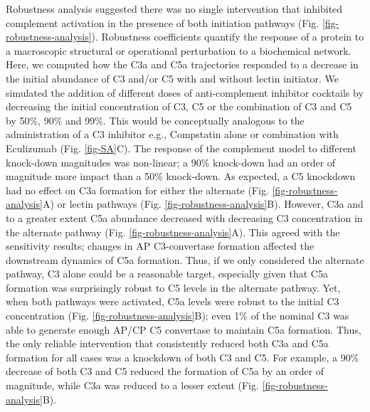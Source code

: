 \documentclass[12pt]{article}
\begin{document}
Robustness analysis suggested there was no single intervention that inhibited complement activation in the presence of both initiation pathways (Fig. \ref{fig-robustness-analysis}).
Robustness coefficients quantify the response of a protein to a macroscopic structural or operational perturbation to a biochemical network.
Here, we computed how the C3a and C5a trajectories responded to a decrease in the initial abundance of C3 and/or C5 with and without lectin initiator.
We simulated the addition of different doses of anti-complement inhibitor cocktails by decreasing the initial concentration of C3, C5 or the combination of C3 and C5 by 50\%, 90\% and 99\%. This would be conceptually analogous to the administration of a C3 inhibitor e.g., Compstatin alone or combination with Eculizumab (Fig. \ref{fig-SA}C).
The response of the complement model to different knock-down magnitudes was non-linear; a 90\% knock-down had an order of magnitude more impact than a 50\% knock-down.
As expected, a C5 knockdown had no effect on C3a formation for either the alternate (Fig. \ref{fig-robustness-analysis}A) or lectin pathways
(Fig. \ref{fig-robustness-analysis}B).
However, C3a and to a greater extent C5a abundance decreased with decreasing C3 concentration in the alternate pathway (Fig. \ref{fig-robustness-analysis}A).
This agreed with the sensitivity results; changes in AP C3-convertase formation affected the downstream dynamics of C5a formation.
Thus, if we only considered the alternate pathway, C3 alone could be a reasonable target, especially given that C5a formation was surprisingly robust to C5 levels in the alternate pathway.
Yet, when both pathways were activated, C5a levels were robust to the initial C3 concentration (Fig. \ref{fig-robustness-analysis}B);
even 1\% of the nominal C3 was able to generate enough AP/CP C5 convertase to maintain C5a formation.
Thus, the only reliable intervention that consistently reduced both C3a and C5a formation for all cases was a knockdown of both C3 and C5.
For example, a 90\% decrease of both C3 and C5 reduced the formation of C5a by an order of magnitude,
while C3a was reduced to a lesser extent (Fig. \ref{fig-robustness-analysis}B).

\end{document}
